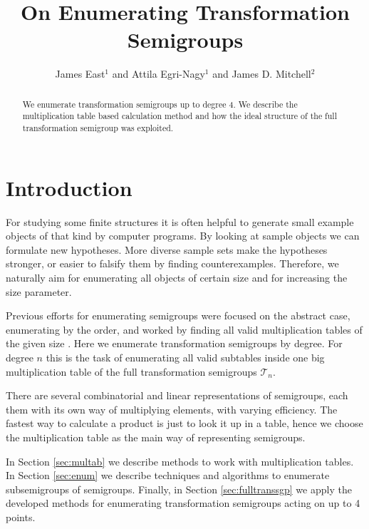 \documentclass{amsart}
\newcommand{\cT}{{\mathcal T}}
\theoremstyle{plain}
\theoremstyle{definition}
\begin{document}
\title{On Enumerating Transformation Semigroups}
\author{James East$^1$ and Attila Egri-Nagy$^{1}$ and James D. Mitchell$^2$}
\address{$^1$Centre for Research in Mathematics, School of Computing, Engineering and Mathematics, University of Western Sydney (Parramatta Campus), Locked Bag 1797, Penrith, NSW 2751, Australia}
\address{$^2$ Mathematical Institute, University of St Andrews, North Haugh, St Andrews, Fife, KY16 9SS, Scotland}

\maketitle
\begin{abstract}
We enumerate transformation semigroups up to degree 4.
We describe the multiplication table based calculation method and how the ideal structure of the full transformation semigroup was exploited.
\end{abstract}
\tableofcontents
\section{Introduction}
For studying some finite structures  it is often helpful to generate small example objects of that kind by computer programs.
By looking at sample objects we can formulate new hypotheses.
More diverse sample sets make the hypotheses stronger, or easier to falsify them by finding counterexamples.
Therefore, we naturally aim for enumerating all objects of certain size and for increasing the size parameter.

Previous efforts for enumerating semigroups were focused on the abstract case, enumerating by the order, and worked by finding all valid multiplication tables of the given size \cite{For55,tamura1,tamura2,Ple67,KRS76,JW77,SZT94,monoidenum2009}.
Here we enumerate transformation semigroups by degree.
For degree $n$ this is the task of enumerating all valid subtables inside one big multiplication table of the  full transformation semigroups $\cT_n$.

There are several combinatorial and linear representations of semigroups, each them with its own way of multiplying elements, with varying efficiency.
The fastest way to calculate a product is just to look it up in a table, hence we choose the multiplication table as the main way of representing semigroups.

In Section \ref{sec:multab} we describe methods to work with multiplication tables.
In Section \ref{sec:enum} we describe techniques and algorithms to enumerate subsemigroups of semigroups.
Finally, in Section \ref{sec:fulltranssgp} we apply the developed methods for enumerating transformation semigroups acting on up to 4 points.
\end{document}
